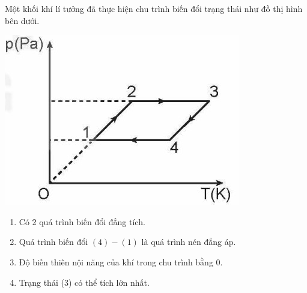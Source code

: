 \begin{ex}
Một khối khí lí tưởng đã thực hiện chu trình biến đổi trạng thái như đồ thị hình bên dưới.
\begin{center}
	\includegraphics[width=0.4\linewidth]{figs/VN12-Y24-PH-SYL-016-4}
\end{center}
\begin{enumerate}[label=\alph*)]
	\item Có 2 quá trình biến đổi đẳng tích.
	\item Quá trình biến đổi $(4) - (1)$ là quá trình nén đẳng áp.
	\item Độ biến thiên nội năng của khí trong chu trình bằng 0.
	\item Trạng thái (3) có thể tích lớn nhất.
\end{enumerate}	
\end{ex}
